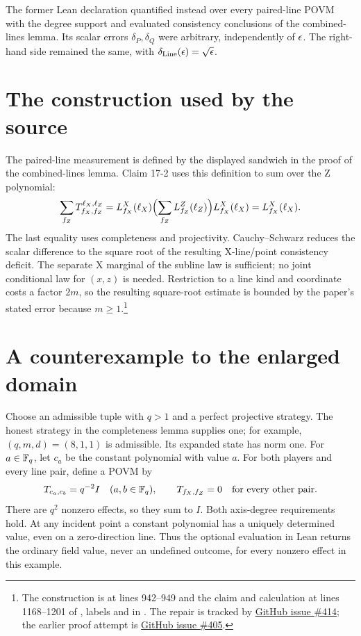 \documentclass[11pt]{article}
\renewcommand{\ghissue}[1]{%
  \href{https://github.com/Dengnifer/MIPStarRE-A/issues/#1}{GitHub issue \##1}}
\begin{document}
The former Lean declaration quantified instead over every paired-line POVM
with the degree support and evaluated consistency conclusions of the
combined-lines lemma. Its scalar errors $\delta_P,\delta_Q$ were arbitrary,
independently of $\epsilon$. The right-hand side remained the same, with
$\delta_{\mathrm{Line}}(\epsilon)=\sqrt{\epsilon}$.

\section{The construction used by the source}

The paired-line measurement is defined by the displayed sandwich in the
proof of the combined-lines lemma. Claim 17-2 uses this definition to sum
over the Z polynomial:
\[
 \sum_{f_Z}T^{\ell_X,\ell_Z}_{f_X,f_Z}
 =L^X_{f_X}(\ell_X)
   \Bigl(\sum_{f_Z}L^Z_{f_Z}(\ell_Z)\Bigr)L^X_{f_X}(\ell_X)
 =L^X_{f_X}(\ell_X).
\]
The last equality uses completeness and projectivity. Cauchy--Schwarz
reduces the scalar difference to the square root of the resulting
X-line/point consistency deficit. The separate X marginal of the subline
law is sufficient; no joint conditional law for $(x,z)$ is needed.
Restriction to a line kind and coordinate costs a factor $2m$, so the
resulting square-root estimate is bounded by the paper's stated error
because $m\geq1$.\footnote{The construction is at lines 942--949 and the
claim and calculation at lines 1168--1201 of
,
labels  and  in
\cite{Ji2020MIPStar}. The repair is tracked by \ghissue{414}; the earlier
proof attempt is \ghissue{405}.}

\section{A counterexample to the enlarged domain}

Choose an admissible tuple with $q>1$ and a perfect projective strategy.
The honest strategy in the completeness lemma supplies one; for example,
$(q,m,d)=(8,1,1)$ is admissible. Its expanded state has norm one. For
$a\in\mathbb{F}_q$, let $c_a$ be the constant polynomial with value $a$. For both
players and every line pair, define a POVM by
\[
 T_{c_a,c_b}=q^{-2}I\quad(a,b\in\mathbb{F}_q),\qquad
 T_{f_X,f_Z}=0\quad\text{for every other pair}.
\]
There are $q^2$ nonzero effects, so they sum to $I$. Both axis-degree
requirements hold. At any incident point a constant polynomial has a
uniquely determined value, even on a zero-direction line. Thus the optional
evaluation in Lean returns the ordinary field value, never an undefined
outcome, for every nonzero effect in this example.
\end{document}
